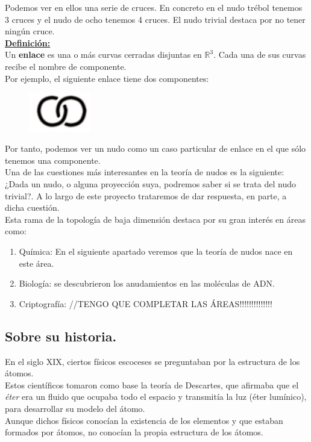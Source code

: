 \documentclass[14pt]{extarticle}
\begin{document}
  Podemos ver en ellos una serie de cruces. En concreto en el nudo trébol tenemos 3 cruces y el nudo de ocho tenemos 4 cruces. El nudo trivial destaca por no tener ningún cruce. \\
  
    \underline{\textbf{Definición:}}\\
     Un \textbf{enlace} es una o más curvas cerradas disjuntas en $\mathds{R}^{3}$. Cada una de sus curvas recibe el nombre de componente.\\
     Por ejemplo, el siguiente enlace tiene dos componentes:
  \begin{figure}[h!]
  	\includegraphics[width=2.7cm]{enlace.png}
  	\centering
  	\label{dos} 
  \end{figure}
    \newpage
    Por tanto, podemos ver un nudo como un caso particular de enlace en el que sólo tenemos una componente.\\
    
  Una de las cuestiones más interesantes en la teoría de nudos es la siguiente: \\
  ¿Dada un nudo, o alguna proyección suya, podremos saber si se trata del nudo trivial?. A lo largo de este proyecto trataremos de dar respuesta, en parte, a dicha cuestión.\\
  
  Esta rama de la topología de baja dimensión destaca por su gran interés en áreas como:
  \begin{enumerate}
  	\item Química: En el siguiente apartado veremos que la teoría de nudos nace en este área.
  	\item Biología: se descubrieron los anudamientos en las moléculas de ADN. 
  	\item Criptografía: 
  	//TENGO QUE COMPLETAR LAS ÁREAS!!!!!!!!!!!!!!
  \end{enumerate}
 
  \newpage
\subsection{Sobre su historia.}
En el siglo XIX, ciertos físicos escoceses se preguntaban por la estructura de los átomos.\\
Estos científicos tomaron como base la teoría de Descartes, que afirmaba que el \textit{éter} era un fluido que ocupaba todo el espacio y transmitía la luz (éter lumínico), para desarrollar su modelo del átomo. \\
Aunque dichos físicos conocían la existencia de los elementos y que estaban formados por átomos, no conocían la propia estructura de los átomos. \\
\end{document}
